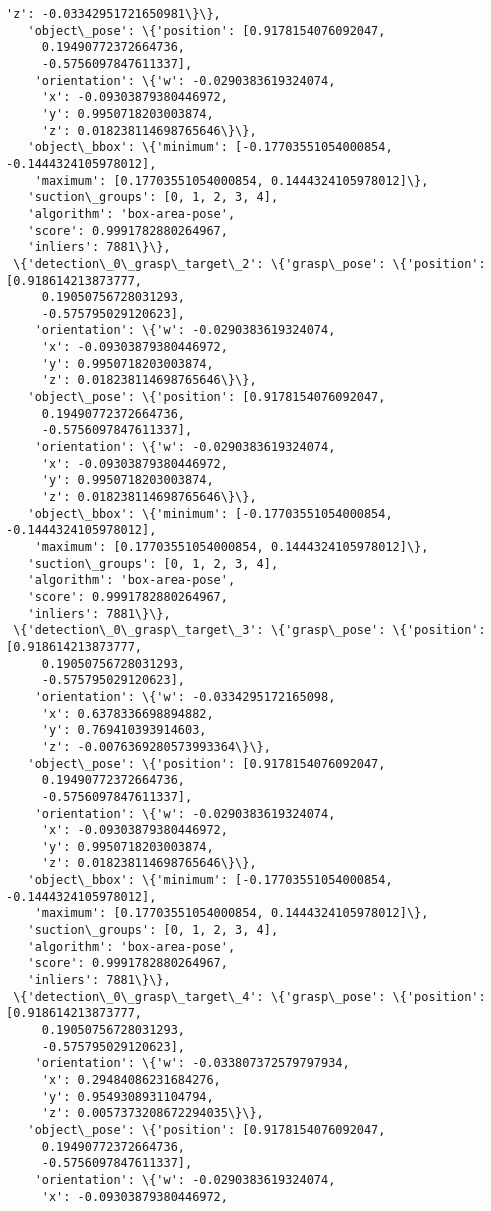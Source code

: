 \documentclass[11pt]{article}
\begin{document}
\begin{tcolorbox}[breakable, size=fbox, boxrule=.5pt, pad at break*=1mm, opacityfill=0]
\begin{Verbatim}[commandchars=\\\{\}]
     'z': -0.03342951721650981\}\},
   'object\_pose': \{'position': [0.9178154076092047,
     0.19490772372664736,
     -0.5756097847611337],
    'orientation': \{'w': -0.0290383619324074,
     'x': -0.09303879380446972,
     'y': 0.9950718203003874,
     'z': 0.018238114698765646\}\},
   'object\_bbox': \{'minimum': [-0.17703551054000854, -0.1444324105978012],
    'maximum': [0.17703551054000854, 0.1444324105978012]\},
   'suction\_groups': [0, 1, 2, 3, 4],
   'algorithm': 'box-area-pose',
   'score': 0.9991782880264967,
   'inliers': 7881\}\},
 \{'detection\_0\_grasp\_target\_2': \{'grasp\_pose': \{'position': [0.918614213873777,
     0.19050756728031293,
     -0.575795029120623],
    'orientation': \{'w': -0.0290383619324074,
     'x': -0.09303879380446972,
     'y': 0.9950718203003874,
     'z': 0.018238114698765646\}\},
   'object\_pose': \{'position': [0.9178154076092047,
     0.19490772372664736,
     -0.5756097847611337],
    'orientation': \{'w': -0.0290383619324074,
     'x': -0.09303879380446972,
     'y': 0.9950718203003874,
     'z': 0.018238114698765646\}\},
   'object\_bbox': \{'minimum': [-0.17703551054000854, -0.1444324105978012],
    'maximum': [0.17703551054000854, 0.1444324105978012]\},
   'suction\_groups': [0, 1, 2, 3, 4],
   'algorithm': 'box-area-pose',
   'score': 0.9991782880264967,
   'inliers': 7881\}\},
 \{'detection\_0\_grasp\_target\_3': \{'grasp\_pose': \{'position': [0.918614213873777,
     0.19050756728031293,
     -0.575795029120623],
    'orientation': \{'w': -0.0334295172165098,
     'x': 0.6378336698894882,
     'y': 0.769410393914603,
     'z': -0.0076369280573993364\}\},
   'object\_pose': \{'position': [0.9178154076092047,
     0.19490772372664736,
     -0.5756097847611337],
    'orientation': \{'w': -0.0290383619324074,
     'x': -0.09303879380446972,
     'y': 0.9950718203003874,
     'z': 0.018238114698765646\}\},
   'object\_bbox': \{'minimum': [-0.17703551054000854, -0.1444324105978012],
    'maximum': [0.17703551054000854, 0.1444324105978012]\},
   'suction\_groups': [0, 1, 2, 3, 4],
   'algorithm': 'box-area-pose',
   'score': 0.9991782880264967,
   'inliers': 7881\}\},
 \{'detection\_0\_grasp\_target\_4': \{'grasp\_pose': \{'position': [0.918614213873777,
     0.19050756728031293,
     -0.575795029120623],
    'orientation': \{'w': -0.033807372579797934,
     'x': 0.29484086231684276,
     'y': 0.9549308931104794,
     'z': 0.0057373208672294035\}\},
   'object\_pose': \{'position': [0.9178154076092047,
     0.19490772372664736,
     -0.5756097847611337],
    'orientation': \{'w': -0.0290383619324074,
     'x': -0.09303879380446972,

\end{Verbatim}
\end{tcolorbox}
\end{document}
